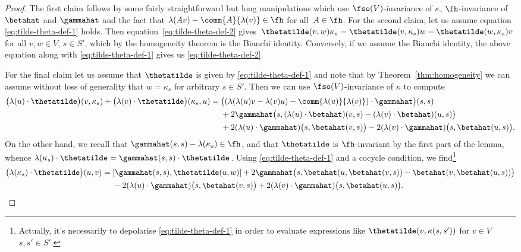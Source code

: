 \begin{proof}
	The first claim follows by some fairly straightforward but long manipulations which use $\fso(V)$-invariance of $\kappa$, $\fh$-invariance of $\betahat$ and $\gammahat$ and the fact that $\lambda(Av)-\comm{A}{\lambda(v)}\in\fh$ for all~${A\in\fh}$. For the second claim, let us assume equation \eqref{eq:tilde-theta-def-1} holds. Then equation~\eqref{eq:tilde-theta-def-2} gives~${\thetatilde(v,w)\kappa_s = \thetatilde(v,\kappa_s)w - \thetatilde(w,\kappa_s)v}
$
	for all $v,w\in V$, $s\in S'$, which by the homogeneity theorem is the Bianchi identity. Conversely, if we assume the Bianchi identity, the above equation along with \eqref{eq:tilde-theta-def-1} gives us \eqref{eq:tilde-theta-def-2}.
	
	For the final claim let us assume that $\thetatilde$ is given by \eqref{eq:tilde-theta-def-1} and note that by Theorem~\ref{thm:homogeneity} we can assume without loss of generality that $w=\kappa_s$ for arbitrary $s\in S'$. Then we can use $\fso(V)$-invariance of $\kappa$ to compute
	\begin{align*}
		\bigl(\lambda(u)\cdot\thetatilde\bigr)(v,\kappa_s) + \bigl(\lambda(v)\cdot\thetatilde\bigr)(\kappa_s,u)
			={}& \bigl((\lambda(\lambda(u)v-\lambda(v)u)
				- \comm{\lambda(u)}{\lambda(v)})\cdot\gammahat\bigr)(s,s) \\
				& + 2\gammahat\bigl(s,(\lambda(u)\cdot\betahat)(v,s)
				- (\lambda(v)\cdot\betahat)(u,s)\bigr)\\
				& + 2(\lambda(u)\cdot\gammahat)\bigl(s,\betahat(v,s)\bigr)
				- 2(\lambda(v)\cdot\gammahat)\bigl(s,\betahat(u,s)\bigr).
	\end{align*}
	On the other hand, we recall that $\gammahat(s,s)-\lambda(\kappa_s)\in\fh$, and that $\thetatilde$ is $\fh$-invariant by the first part of the lemma, whence $\lambda(\kappa_s)\cdot\thetatilde=\gammahat(s,s)\cdot\thetatilde$. Using \eqref{eq:tilde-theta-def-1} and a cocycle condition, we find\footnote{Actually, it's necessarily to depolarise \eqref{eq:tilde-theta-def-1} in order to evaluate expressions like $\thetatilde(v,\kappa(s,s'))$ for $v\in V$ $s,s'\in S'$.}
	\begin{align*}
		\bigl(\lambda(\kappa_s)\cdot\thetatilde\bigr)(u,v) ={}& [\gammahat(s,s),\thetatilde(u,w)]
			+ 2\gammahat\bigl(s,\betahat(u,\betahat(v,s))-\betahat(v,\betahat(u,s))\bigr)\\
			& - 2(\lambda(u)\cdot\gammahat)\bigl(s,\betahat(v,s)\bigr)
			+ 2(\lambda(v)\cdot\gammahat)\bigl(s,\betahat(u,s)\bigr).
	\end{align*}

\end{proof}
